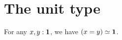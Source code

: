 \documentclass[hott-all.tex]{subfiles}
\begin{document}
\section{The unit type}
\label{sec:compute-unit}


\begin{thm}\label{thm:path-unit}
  For any $x,y:\mathbf{1}$, we have $(x=y) \simeq \mathbf{1}$.
\end{thm}

%
%
%
%
%
\end{document}
